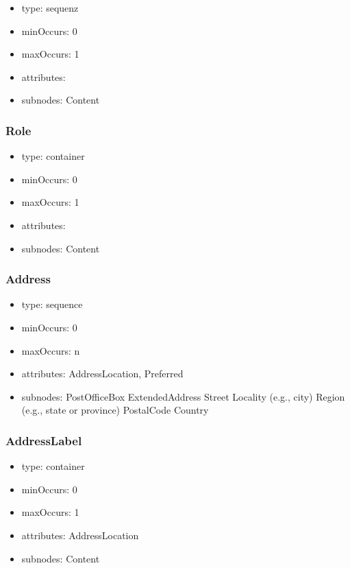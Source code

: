 \documentclass[a4paper,11pt]{article}
\begin{document}
\begin{itemize}
  \item type: sequenz
  \item minOccurs: 0
  \item maxOccurs: 1
  \item attributes:
  \item subnodes:
  \subitem Content
\end{itemize}

\subsubsection{Role}
\begin{itemize}
  \item type: container
  \item minOccurs: 0
  \item maxOccurs: 1
  \item attributes:
  \item subnodes:
  \subitem Content
\end{itemize}

\subsubsection{Address}
\begin{itemize}
  \item type: sequence
  \item minOccurs: 0
  \item maxOccurs: n
  \item attributes: AddressLocation, Preferred
  \item subnodes:
  \subitem PostOfficeBox
  \subitem ExtendedAddress
  \subitem Street
  \subitem Locality (e.g., city)
  \subitem Region (e.g., state or province)
  \subitem PostalCode
  \subitem Country
\end{itemize}

\subsubsection{AddressLabel}
\begin{itemize}
  \item type: container
  \item minOccurs: 0
  \item maxOccurs: 1
  \item attributes: AddressLocation
  \item subnodes:
  \subitem Content
\end{itemize}
\end{document}
